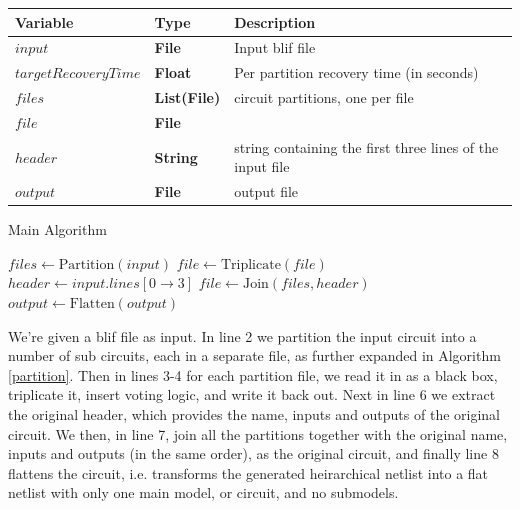\documentclass[12pt,final,oneside]{dwThesis} %
\begin{document}
   \begin{algorithm}
      \begin{center}
         \begin{tabular}{lll}
            \toprule
            Variable & Type & Description\\
            \midrule
            $input$ & \textbf{File} &  Input blif file\\
            $targetRecoveryTime$ & \textbf{ Float} &  Per partition recovery time (in seconds) \\
            $files$ & \textbf{List(File)} &  circuit partitions, one per file \\
            $file$ & \textbf{File} &  \\
            $header$ & \textbf{ String} &  string containing the first three lines of the input file \\
            $output$ & \textbf{File} &  output file\\
            \bottomrule
         \end{tabular}
      \end{center}
      \caption{Main Algorithm}\label{main}
      \begin{algorithmic}[1]
         \State $files \gets \mbox{Partition}(input)$
         \State $file \gets \mbox{Triplicate}(file)$
         \EndFor
         \State $header \gets input.lines[0\to 3]$
         \State $file \gets \mbox{Join}(files, header)$
         \State $output \gets \mbox{Flatten}(output)$
         \EndProcedure
      \end{algorithmic}
   \end{algorithm}
   We're given a blif file as input.
   In line 2 we partition the input circuit into a number of sub circuits, each in a separate file, as further expanded in Algorithm \ref{partition}.
   Then in lines 3-4 for each partition file, we read it in as a black box, triplicate it, insert voting logic, and write it back out.
   Next in line 6 we extract the original header, which provides the name, inputs and outputs of the original circuit.
   We then, in line 7, join all the partitions together with the original name, inputs and outputs (in the same order), as the original circuit, and finally line 8 flattens the circuit, i.e. transforms the generated heirarchical netlist into a flat netlist with only one main model, or circuit, and no submodels.

   \newpage
\end{document}
